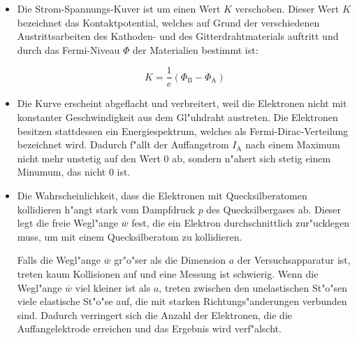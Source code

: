 		\begin{itemize}
			\item Die Strom-Spannungs-Kuver ist um einen Wert $K$ verschoben.
			Dieser Wert $K$ bezeichnet das Kontaktpotential, welches auf Grund der verschiedenen Austrittsarbeiten des Kathoden- und des Gitterdrahtmaterials auftritt und durch das Fermi-Niveau $\Phi$ der Materialien bestimmt ist:

			\begin{equation*}
				K = \frac{1}{e} (\Phi_\mathrm{B} - \Phi_\mathrm{A})
			\end{equation*}

			\item Die Kurve erscheint abgeflacht und verbreitert, weil die Elektronen nicht mit konstanter Geschwindigkeit aus dem Gl"uhdraht austreten.
			Die Elektronen besitzen stattdessen ein Energiespektrum, welches als Fermi-Dirac-Verteilung bezeichnet wird.
			Dadurch f"allt der Auffangstrom $I_\mathrm{A}$ nach einem Maximum nicht mehr unstetig auf den Wert 0 ab, sondern n"ahert sich stetig einem Minumum, das nicht 0 ist.

			\item Die Wahrscheinlichkeit, dass die Elektronen mit Quecksilberatomen kollidieren h"angt stark vom Dampfdruck $p$ des Quecksilbergases ab.
			Dieser legt die freie Wegl"ange $\overline{w}$ fest, die ein Elektron durchschnittlich zur"ucklegen muss, um mit einem Quecksilberatom zu kollidieren.

			Falls die Wegl"ange $\overline{w}$ gr"o"ser als die Dimension $a$ der Versuchsapparatur ist, treten kaum Kollisionen auf und eine Messung ist schwierig.
			Wenn die Wegl"ange $\overline{w}$ viel kleiner ist als $a$, treten zwischen den unelastischen St"o"sen viele elastische St"o"se auf, die mit starken Richtungs"anderungen verbunden sind.
			Dadurch verringert sich die Anzahl der Elektronen, die die Auffangelektrode erreichen und das Ergebnis wird verf"alscht.
		\end{itemize}

	\clearpage

